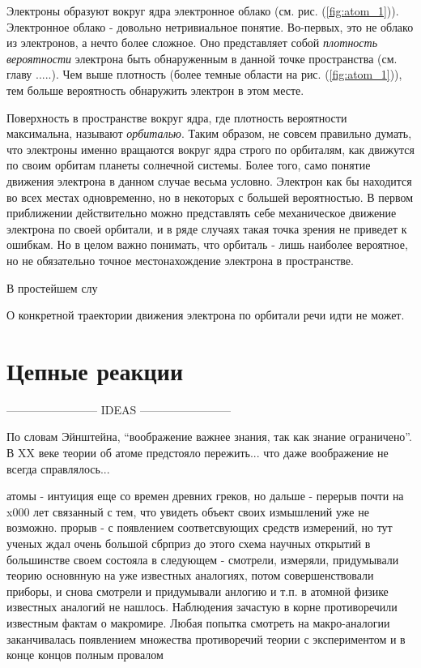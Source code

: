 Электроны образуют вокруг ядра электронное облако (см. рис. (\ref{fig:atom_1})).
Электронное облако - довольно нетривиальное понятие.
Во-первых, это не облако из электронов, а нечто более сложное.
Оно представляет собой \textit{плотность вероятности} электрона быть обнаруженным в данной точке пространства (см. главу .....).
Чем выше плотность (более темные области на рис. (\ref{fig:atom_1})), тем больше вероятность обнаружить электрон в этом месте.

Поверхность в пространстве вокруг ядра, где плотность вероятности максимальна, называют \textit{орбиталью}.
Таким образом, не совсем правильно думать, что электроны именно вращаются вокруг ядра строго по орбиталям, как движутся по своим орбитам планеты солнечной системы.
Более того, само понятие движения электрона в данном случае весьма условно.
Электрон как бы находится во всех местах одновременно, но в некоторых с большей вероятностью. 
В первом приближении действительно можно представлять себе механическое движение электрона по своей орбитали, и в ряде случаях такая точка зрения не приведет к ошибкам.
Но в целом важно понимать, что орбиталь - лишь наиболее вероятное, но не обязательно точное местонахождение электрона в пространстве.

В простейшем слу


О конкретной траектории движения электрона по орбитали речи идти не может.


\section*{Цепные реакции}


------------------------ IDEAS ------------------------ 

По словам Эйнштейна, ``воображение важнее знания, так как знание ограничено''.
В XX веке теории об атоме предстояло пережить... что даже воображение не всегда справлялось...



атомы - интуиция еще со времен древних греков, но дальше - перерыв почти на x000 лет связанный с тем, что увидеть объект своих измышлений уже не возможно.
прорыв - с появлением соответсвующих средств измерений, но тут ученых ждал очень большой сбрприз
до этого схема научных открытий в большинстве своем состояла в следующем - смотрели, измеряли, придумывали теорию основнную на уже известных аналогиях, потом совершенствовали приборы, и снова смотрели и придумывали анлогию и т.п.
в атомной физике известных аналогий не нашлось. Наблюдения зачастую в корне противоречили известным фактам о макромире. Любая попытка смотреть на макро-аналогии заканчивалась появлением множества противоречий теории с экспериментом и в конце концов полным провалом 


